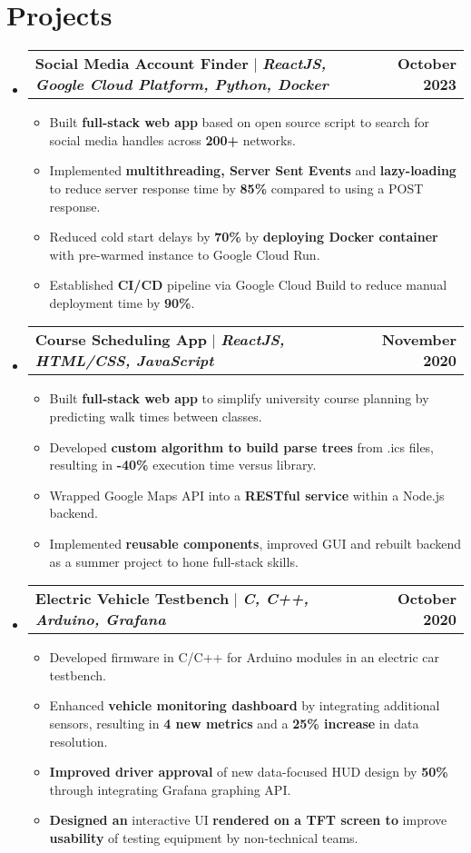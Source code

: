 \documentclass[letterpaper,11pt]{article}
\makeatletter
\newcommand{\bluey}[1]{{\color{customblue}#1}}
\newcommand{\resumeItem}[1]{
  \item\small{
    {#1 \vspace{-2pt}}
  }
}
\newcommand{\resumeProjectHeading}[2]{
    \item
    \begin{tabular*}{1.001\textwidth}{l@{\extracolsep{\fill}}r}
      \small#1 & \textbf{\small #2}\\
    \end{tabular*}\vspace{-7pt}
}
\newcommand{\resumeSubHeadingListStart}{\begin{itemize}[leftmargin=0.0in, label={}]}
\newcommand{\resumeSubHeadingListEnd}{\end{itemize}}
\newcommand{\resumeItemListStart}{\begin{itemize}}
\newcommand{\resumeItemListEnd}{\end{itemize}\vspace{-5pt}}
\makeatother
\begin{document}
\section{Projects}
    \vspace{-5pt}
    \resumeSubHeadingListStart
      \resumeProjectHeading
          {\textbf{\bluey{Social Media Account Finder}} $|$ \emph{ \textbf{ReactJS, Google Cloud Platform, Python, Docker}}}{October 2023}
          \resumeItemListStart
            \resumeItem{Built \textbf{full-stack web app} based on open source script to search for social media handles across \textbf{200+} networks.}
            \resumeItem{Implemented \textbf{multithreading, Server Sent Events} and \textbf{lazy-loading} to reduce server response time by \textbf{85\%} compared to using a POST response.}
            \resumeItem{Reduced cold start delays by \textbf{70\%} by \textbf{deploying Docker container} with pre-warmed instance to Google Cloud Run.}
            \resumeItem{Established \textbf{CI/CD} pipeline via Google Cloud Build to reduce manual deployment time by \textbf{90\%}.}
          \resumeItemListEnd
          \vspace{-13pt}
      \resumeProjectHeading
          {\textbf{\bluey{Course Scheduling App}} $|$ \emph{\textbf{ReactJS, HTML/CSS, JavaScript}}}{November 2020}
          \resumeItemListStart
            \resumeItem{Built \textbf{full-stack web app} to simplify university course planning by predicting walk times between classes.}
            \resumeItem{Developed \textbf{custom algorithm to build parse trees} from .ics files, resulting in \textbf{-40\%} execution time versus library.}
            \resumeItem{Wrapped Google Maps API into a \textbf{RESTful service} within a Node.js backend.}
            \resumeItem{Implemented \textbf{reusable components}, improved GUI and rebuilt backend as a summer project to hone full-stack skills.}
          \resumeItemListEnd 
          \vspace{-13pt}
          \resumeProjectHeading
          {\textbf{\bluey{Electric Vehicle Testbench}} $|$ \emph{\textbf{C, C++, Arduino, Grafana}}}{October 2020}
          \resumeItemListStart
            \resumeItem{Developed firmware in C/C++ for Arduino modules in an electric car testbench.}
            \resumeItem{Enhanced \textbf{vehicle monitoring dashboard} by integrating additional sensors, resulting in \textbf{4 new metrics} and a \textbf{25\% increase} in data resolution.}
            \resumeItem{\textbf{Improved driver approval} of new data-focused HUD design by \textbf{50\%} through integrating Grafana graphing API.}
            \resumeItem{\textbf{Designed an }interactive UI\textbf{ rendered on a TFT screen to }improve \textbf{usability} of testing equipment by non-technical teams.}            
          \resumeItemListEnd 
    \resumeSubHeadingListEnd
\vspace{-15pt}
\end{document}
